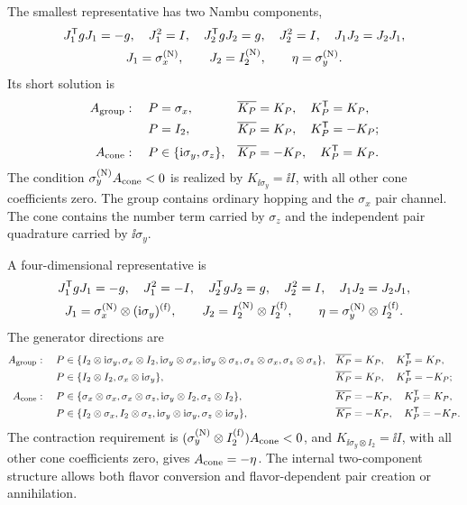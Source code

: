 The smallest representative has two Nambu components,
\begin{equation}
\begin{gathered}
J_1^{\mathsf{T}} gJ_1=-g,\quad J_1^2=I,\quad
J_2^{\mathsf{T}} gJ_2=g,\quad J_2^2=I,\quad
J_1J_2=J_2J_1,\\
J_1=\sigma_x^{({\rm N})},\qquad J_2=I_2^{({\rm N})},\qquad \eta=\sigma_y^{({\rm N})}.
\end{gathered}
\end{equation}
Its short solution is
\begin{align*}
A_{\rm group}:\quad
P&=\sigma_x,&&\overline{K_P}=K_P,\quad K_P^{\mathsf{T}}=K_P,\\
P&=I_2,&&\overline{K_P}=K_P,\quad K_P^{\mathsf{T}}=-K_P;\\[2pt]
A_{\rm cone}:\quad
P&\in\{\mathrm{i}\sigma_y,\sigma_z\},&&\overline{K_P}=-K_P,\quad K_P^{\mathsf{T}}=K_P.
\end{align*}
The condition \(\sigma_y^{({\rm N})}A_{\rm cone}<0\) is realized by
\(K_{\ii\sigma_y}=\ii I\), with all other cone coefficients zero.  The group contains ordinary hopping and the \(\sigma_x\) pair channel.  The cone contains the number term carried by \(\sigma_z\) and the independent pair quadrature carried by \(\ii\sigma_y\).

A four-dimensional representative is
\begin{equation}
\begin{gathered}
J_1^{\mathsf{T}} gJ_1=-g,\quad J_1^2=-I,\quad
J_2^{\mathsf{T}} gJ_2=g,\quad J_2^2=I,\quad
J_1J_2=J_2J_1,\\
J_1=\sigma_x^{({\rm N})}\otimes(\mathrm{i}\sigma_y)^{({\rm f})},\qquad
J_2=I_2^{({\rm N})}\otimes I_2^{({\rm f})},\qquad
\eta=\sigma_y^{({\rm N})}\otimes I_2^{({\rm f})}.
\end{gathered}
\end{equation}
The generator directions are
\begin{align*}
A_{\rm group}:\quad
P&\in\{I_2\otimes\mathrm{i}\sigma_y,\sigma_x\otimes I_2,
\mathrm{i}\sigma_y\otimes\sigma_x,\mathrm{i}\sigma_y\otimes\sigma_z,
\sigma_z\otimes\sigma_x,\sigma_z\otimes\sigma_z\},
&&\overline{K_P}=K_P,\quad K_P^{\mathsf{T}}=K_P,\\
P&\in\{I_2\otimes I_2,\sigma_x\otimes\mathrm{i}\sigma_y\},
&&\overline{K_P}=K_P,\quad K_P^{\mathsf{T}}=-K_P;\\[2pt]
A_{\rm cone}:\quad
P&\in\{\sigma_x\otimes\sigma_x,\sigma_x\otimes\sigma_z,
\mathrm{i}\sigma_y\otimes I_2,\sigma_z\otimes I_2\},
&&\overline{K_P}=-K_P,\quad K_P^{\mathsf{T}}=K_P,\\
P&\in\{I_2\otimes\sigma_x,I_2\otimes\sigma_z,
\mathrm{i}\sigma_y\otimes\mathrm{i}\sigma_y,\sigma_z\otimes\mathrm{i}\sigma_y\},
&&\overline{K_P}=-K_P,\quad K_P^{\mathsf{T}}=-K_P.
\end{align*}
The contraction requirement is \((\sigma_y^{({\rm N})}\otimes I_2^{({\rm f})})A_{\rm cone}<0\), and
\(K_{\ii\sigma_y\otimes I_2}=\ii I\), with all other cone coefficients zero, gives \(A_{\rm cone}=-\eta\).  The internal two-component structure allows both flavor conversion and flavor-dependent pair creation or annihilation.

